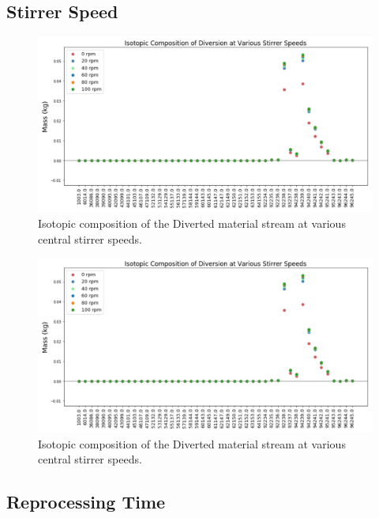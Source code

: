 \subsection{Stirrer Speed}

\begin{figure}
	\includegraphics[width=\linewidth]{images/ref-rot-comp}
	\caption{Isotopic composition of the Diverted material stream at various central stirrer speeds.}
	\label{fig:ref-rot-sa}
\end{figure}

\begin{figure}
	\includegraphics[width=\linewidth]{images/ref-rot-comp}
	\caption{Isotopic composition of the Diverted material stream at various central stirrer speeds.}
	\label{fig:ref-rot-diff}
\end{figure}

\subsection{Reprocessing Time}

